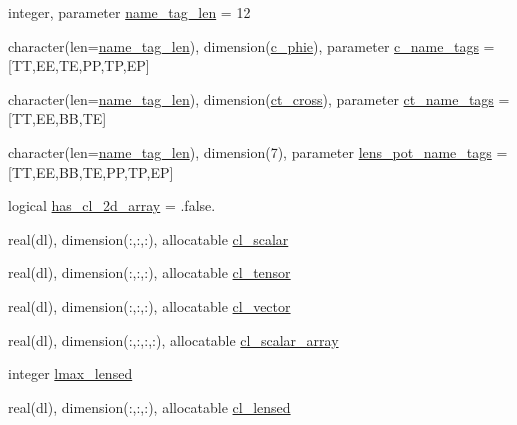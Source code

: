 \begin{DoxyCompactItemize}
\item 
integer, parameter \mbox{\hyperlink{namespacemodeldata_a2ead755d89390eb003edcde34ebf2c99}{name\+\_\+tag\+\_\+len}} = 12
\item 
character(len=\mbox{\hyperlink{namespacemodeldata_a2ead755d89390eb003edcde34ebf2c99}{name\+\_\+tag\+\_\+len}}), dimension(\mbox{\hyperlink{namespacemodeldata_a0b2ffa13b78be0e1097e0696f61b3d67}{c\+\_\+phie}}), parameter \mbox{\hyperlink{namespacemodeldata_a5d4df179847dfc001c062789b178f4d1}{c\+\_\+name\+\_\+tags}} = \mbox{[}\textquotesingle{}TT\textquotesingle{},\textquotesingle{}EE\textquotesingle{},\textquotesingle{}TE\textquotesingle{},\textquotesingle{}PP\textquotesingle{},\textquotesingle{}TP\textquotesingle{},\textquotesingle{}EP\textquotesingle{}\mbox{]}
\item 
character(len=\mbox{\hyperlink{namespacemodeldata_a2ead755d89390eb003edcde34ebf2c99}{name\+\_\+tag\+\_\+len}}), dimension(\mbox{\hyperlink{namespacemodeldata_a76668d6bad37db06c7b9a47cdeba14dc}{ct\+\_\+cross}}), parameter \mbox{\hyperlink{namespacemodeldata_add55f08ccdcc65479fca4cd2858b420d}{ct\+\_\+name\+\_\+tags}} = \mbox{[}\textquotesingle{}TT\textquotesingle{},\textquotesingle{}EE\textquotesingle{},\textquotesingle{}BB\textquotesingle{},\textquotesingle{}TE\textquotesingle{}\mbox{]}
\item 
character(len=\mbox{\hyperlink{namespacemodeldata_a2ead755d89390eb003edcde34ebf2c99}{name\+\_\+tag\+\_\+len}}), dimension(7), parameter \mbox{\hyperlink{namespacemodeldata_ac4a0361c6d9a7692c9cbf7a08dc43e49}{lens\+\_\+pot\+\_\+name\+\_\+tags}} = \mbox{[}\textquotesingle{}TT\textquotesingle{},\textquotesingle{}EE\textquotesingle{},\textquotesingle{}BB\textquotesingle{},\textquotesingle{}TE\textquotesingle{},\textquotesingle{}PP\textquotesingle{},\textquotesingle{}TP\textquotesingle{},\textquotesingle{}EP\textquotesingle{}\mbox{]}
\item 
logical \mbox{\hyperlink{namespacemodeldata_a446d6a37d3ee5445c94a5f0d5470021a}{has\+\_\+cl\+\_\+2d\+\_\+array}} = .false.
\item 
real(dl), dimension(\+:,\+:,\+:), allocatable \mbox{\hyperlink{namespacemodeldata_a1d7527074ae8035793a2d9cf5cb4a8e8}{cl\+\_\+scalar}}
\item 
real(dl), dimension(\+:,\+:,\+:), allocatable \mbox{\hyperlink{namespacemodeldata_a3108cab8cb9fec5823d887825efd266d}{cl\+\_\+tensor}}
\item 
real(dl), dimension(\+:,\+:,\+:), allocatable \mbox{\hyperlink{namespacemodeldata_ab8016bbfb187a558b12d8a9c17f6b85c}{cl\+\_\+vector}}
\item 
real(dl), dimension(\+:,\+:,\+:,\+:), allocatable \mbox{\hyperlink{namespacemodeldata_a24816a1c9914f5b5567b61ed37aa320b}{cl\+\_\+scalar\+\_\+array}}
\item 
integer \mbox{\hyperlink{namespacemodeldata_a538b61c12ebffc4e237d03392898a395}{lmax\+\_\+lensed}}
\item 
real(dl), dimension(\+:,\+:,\+:), allocatable \mbox{\hyperlink{namespacemodeldata_aa6168a25119bd0a5064f367267954562}{cl\+\_\+lensed}}
\end{DoxyCompactItemize}


